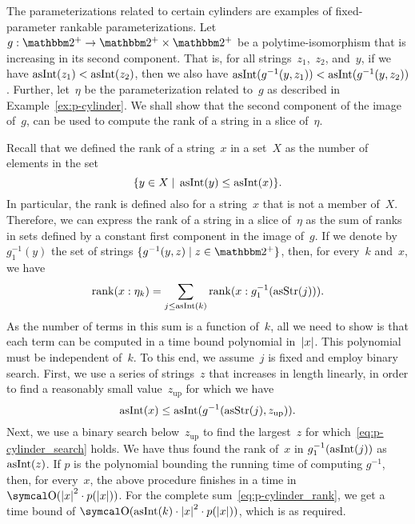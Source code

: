 \begin{example}
\label{ex:fp-rankable}%
  The parameterizations related to certain \pdash{}cylinders are examples of fixed-parameter \pdash{}rankable parameterizations.
  Let $g : \binary^+ \to \binary^+ \times \binary^+$ be a polytime-isomorphism that is increasing in its second component.
  That is, for all strings~$z_1$,~$z_2$, and~$y$, if we have $\operatorname{asInt}(z_1) < \operatorname{asInt}(z_2)$, then we also have $\operatorname{asInt}(g^{-1}(y, z_1)) < \operatorname{asInt}(g^{-1}(y, z_2))$.
  Further, let~$\eta$ be the parameterization related to~$g$ as described in Example~\ref{ex:p-cylinder}.
  We shall show that the second component of the image of~$g$, can be used to compute the rank of a string in a slice of~$\eta$.

  Recall that we defined the rank of a string~$x$ in a set~$X$ as the number of elements in the set
  \begin{equation*}
    \{y \in X \;|\; \operatorname{asInt}(y) \le \operatorname{asInt}(x)\}.
  \end{equation*}
  In particular, the rank is defined also for a string~$x$ that is not a member of~$X$.
  Therefore, we can express the rank of a string in a slice of~$\eta$ as the sum of ranks in sets defined by a constant first component in the image of~$g$.
  If we denote by $g_1^{-1}(y)$ the set of strings $\{g^{-1}(y, z) \st z \in \binary^+\}$, then, for every~$k$ and~$x$, we have
  \begin{equation}
  \label{eq:p-cylinder_rank}
    \operatorname{rank}(x : \eta_k) = \sum_{j \le \operatorname{asInt}(k)} \operatorname{rank}(x : g_1^{-1}(\operatorname{asStr}(j))).
  \end{equation}
  As the number of terms in this sum is a function of~$k$, all we need to show is that each term can be computed in a time bound polynomial in~${\lvert x\rvert}$.
  This polynomial must be independent of~$k$.
  To this end, we assume~$j$ is fixed and employ binary search.
  First, we use a series of strings~$z$ that increases in length linearly, in order to find a reasonably small value~$z_\mathrm{up}$ for which we have
  \begin{equation}
  \label{eq:p-cylinder_search}
    \operatorname{asInt}(x) \le \operatorname{asInt}(g^{-1}(\operatorname{asStr}(j), z_\mathrm{up})).
  \end{equation}
  Next, we use a binary search below~$z_\mathrm{up}$ to find the largest~$z$ for which~\eqref{eq:p-cylinder_search} holds.
  We have thus found the rank of~$x$ in $g_1^{-1}(\operatorname{asInt}(j))$ as $\operatorname{asInt}(z)$.
  If $p$ is the polynomial bounding the running time of computing $g^{-1}$, then, for every~$x$, the above procedure finishes in a time in $\bigO(\length{x}^2 \cdot p(\length{x}))$.
  For the complete sum~\eqref{eq:p-cylinder_rank}, we get a time bound of $\bigO(\asNat(k) \cdot \length{x}^2 \cdot p(\length{x}))$, which is as required.
\end{example}

